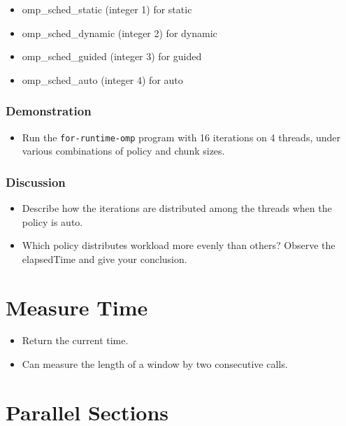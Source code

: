 \documentclass{beamer}
\begin{document}
\begin{frame}
  \frametitle{}
  \begin{itemize}
  \item omp\_sched\_static (integer 1) for static
  \item omp\_sched\_dynamic (integer 2) for dynamic
  \item omp\_sched\_guided (integer 3) for guided
  \item omp\_sched\_auto (integer 4) for auto
  \end{itemize}
\end{frame}



\begin{frame}
  \frametitle{Demonstration}
  \begin{itemize}
  \item Run the {\tt for-runtime-omp} program with 16 iterations on 4
    threads, under various combinations of policy and chunk sizes.
  \end{itemize}
\end{frame}

\begin{frame}
  \frametitle{Discussion}
  \begin{itemize}
  \item Describe how the iterations are distributed among the threads
    when the policy is auto.
  \item Which policy distributes workload more evenly than others?
    Observe the elapsedTime and give your conclusion.
  \end{itemize}
\end{frame}

\section{Measure Time}

\begin{frame}
  \begin{itemize}
  \item Return the current time.
  \item Can measure the length of a window by two consecutive calls.
  \end{itemize}
\end{frame}

\section{Parallel Sections}
\end{document}
